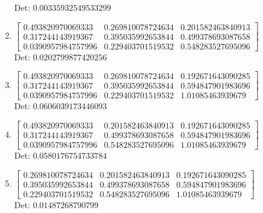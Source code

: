 \documentclass[12pt]{article}
\begin{document}
\begin{enumerate}
Det: $0.00335932549533299$\\

\item $\displaystyle \left[\begin{matrix}0.493820970069333 & 0.269810078724634 & 0.201582463840913\\0.317244143919367 & 0.395035992653844 & 0.499378693087658\\0.0390957984757996 & 0.229403701519532 & 0.548283527695096\end{matrix}\right]$\\

Det: $0.0202799877420256$\\

\item $\displaystyle \left[\begin{matrix}0.493820970069333 & 0.269810078724634 & 0.192671643090285\\0.317244143919367 & 0.395035992653844 & 0.594847901983696\\0.0390957984757996 & 0.229403701519532 & 1.01085463939679\end{matrix}\right]$\\

Det: $0.0606039173446093$\\

\item $\displaystyle \left[\begin{matrix}0.493820970069333 & 0.201582463840913 & 0.192671643090285\\0.317244143919367 & 0.499378693087658 & 0.594847901983696\\0.0390957984757996 & 0.548283527695096 & 1.01085463939679\end{matrix}\right]$\\

Det: $0.0580176754733784$\\

\item $\displaystyle \left[\begin{matrix}0.269810078724634 & 0.201582463840913 & 0.192671643090285\\0.395035992653844 & 0.499378693087658 & 0.594847901983696\\0.229403701519532 & 0.548283527695096 & 1.01085463939679\end{matrix}\right]$\\

Det: $0.01487268790799$\\


\end{enumerate}
\end{document}
